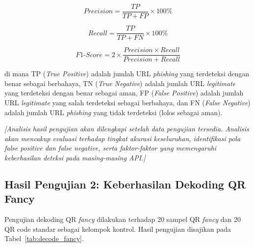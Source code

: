 \documentclass[conference]{IEEEtran}
\begin{document}
\begin{equation}
    Precision = \frac{TP}{TP + FP} \times 100\%
\end{equation}

\begin{equation}
    Recall = \frac{TP}{TP + FN} \times 100\%
\end{equation}

\begin{equation}
    F1\text{-}Score = 2 \times \frac{Precision \times Recall}{Precision + Recall}
\end{equation}

\noindent di mana TP (\textit{True Positive}) adalah jumlah URL \textit{phishing} yang terdeteksi dengan benar sebagai berbahaya, TN (\textit{True Negative}) adalah jumlah URL \textit{legitimate} yang terdeteksi dengan benar sebagai aman, FP (\textit{False Positive}) adalah jumlah URL \textit{legitimate} yang salah terdeteksi sebagai berbahaya, dan FN (\textit{False Negative}) adalah jumlah URL \textit{phishing} yang tidak terdeteksi (lolos sebagai aman).

\textit{[Analisis hasil pengujian akan dilengkapi setelah data pengujian tersedia. Analisis akan mencakup evaluasi terhadap tingkat akurasi keseluruhan, identifikasi pola false positive dan false negative, serta faktor-faktor yang memengaruhi keberhasilan deteksi pada masing-masing API.]}

\subsection{Hasil Pengujian 2: Keberhasilan Dekoding QR Fancy}

Pengujian dekoding QR \textit{fancy} dilakukan terhadap 20 sampel QR \textit{fancy} dan 20 QR code standar sebagai kelompok kontrol. Hasil pengujian disajikan pada Tabel~\ref{tab:decode_fancy}.
\end{document}
